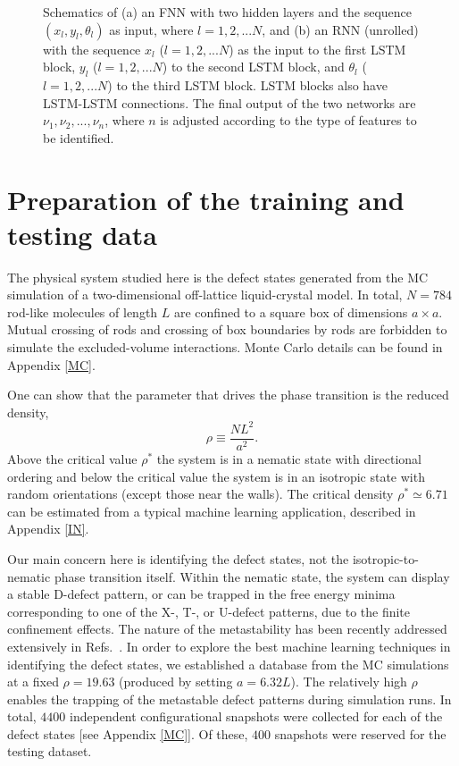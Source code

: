 \begin{figure}
	\caption{Schematics of (a) an FNN with two hidden layers and the sequence $(x_l, y_l, \theta_l)$ as input, where $l=1,2,...N$, and (b)
		an RNN (unrolled) with the sequence $x_l$ ($l=1,2,...N$) as the input to the first LSTM block,
		$y_l$ ($l=1,2,...N$) to the second LSTM block, and $\theta_l$ ($l=1,2,...N$) to the third LSTM block.
		LSTM blocks also have LSTM-LSTM connections.
		The final output of the two networks are $\nu_1, \nu_2, ..., \nu_n$, where $n$ is adjusted according to the type of features to be identified.
	}
	\label{FIG2}
\end{figure}


\section{Preparation of the training and testing data}\label{TrainingData}

The physical system studied here is the defect states generated from the MC simulation of a two-dimensional off-lattice liquid-crystal model.
In total, $N=784$ rod-like molecules of length $L$ are confined to a square box of dimensions $a\times a$.
Mutual crossing of rods and crossing of box boundaries by rods are forbidden to simulate the excluded-volume interactions. Monte Carlo details can be found in Appendix \ref{MC}.

One can show that the parameter that drives the phase transition is the reduced density,
\begin{equation}\label{rho}
\rho \equiv \frac{NL^2}{a^2}.
\end{equation}
Above the critical value $\rho^*$ the system is in a nematic state with directional ordering and below the critical value the system is in an isotropic state with random orientations (except those near the walls). The critical density $\rho^*\simeq 6.71$ can be estimated from a typical machine learning application, described in Appendix \ref{IN}.

Our main concern here is identifying the defect states, not the isotropic-to-nematic phase transition itself.
Within the nematic state, the system can display a stable D-defect pattern, or can be trapped in the free energy minima corresponding to one of the X-, T-, or U-defect patterns, due to the finite confinement effects. The nature of the metastability has been recently addressed extensively in Refs.\ \cite{Galanis2006,Mulder2011,Lewis2014,Cortes2017,Tsakonas2007,Luo2012,Chen2013,Mulder2015}.
In order to explore the best machine learning techniques in identifying the defect states, we established a database from the MC simulations at a fixed  $\rho=19.63$ (produced by setting $a=6.32L$). The relatively high $\rho$  enables the trapping of the metastable defect patterns during simulation runs.
In total, $4400$ independent configurational snapshots were collected for each of the defect states [see Appendix \ref{MC}].
Of these, $400$ snapshots were reserved for the testing dataset.

